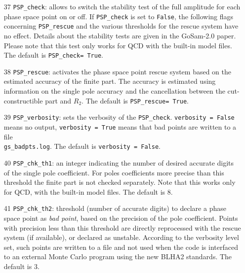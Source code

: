 \documentclass[11pt,a4paper]{refrep}
\newcommand{\gosam}{{\sc GoSam}\xspace}
\begin{document}
\begin{enumerate}
\item[37] \texttt{PSP\_check}: allows to switch the stability test of the full amplitude for 
each phase space point on or off.
If \texttt{PSP\_check} is set to {\tt False}, the following flags concerning 
\texttt{PSP\_rescue} and the various thresholds for the rescue system have no effect.
Details about the stability tests are given in the \gosam-2.0 paper.
Please note that this test only works for QCD  with the built-in model files.
The default is \texttt{PSP\_check= True}. 
\item[38] \texttt{PSP\_rescue}:  
    activates the phase space point rescue system based on the estimated       
    accuracy of the finite part.                                    
    The accuracy is estimated using information on the single       
    pole accuracy and the cancellation between the cut-constructible    
    part and $R_2$.                                                    
The default is \texttt{PSP\_rescue= True}. 
\item[39] \texttt{PSP\_verbosity}:     sets the verbosity of the {\tt PSP\_check}. 
{\tt verbosity = False} means no output,                                     
{\tt verbosity = True} means that bad points are written to a file \\{\tt gs\_badpts.log}.
 The default is {\tt verbosity = False}.
\item[40] \texttt{PSP\_chk\_th1}: an integer indicating the  number of desired accurate digits
of the single pole coefficient. For poles coefficients more precise than this
threshold the finite part is not checked separately.
Note that this works only for QCD, with the built-in model files.    
The default is 8. 
\item[41] \texttt{PSP\_chk\_th2}: threshold (number of accurate digits) to declare a 
phase space point  as {\it bad point}, based on the precision of the pole coefficient.
Points with precision less than this threshold are directly reprocessed with 
    the rescue system (if available), or declared as unstable. According to the
    verbosity level set, such points are written to a file and not used when
    the code is interfaced to an external Monte Carlo program using the new BLHA2 standards.
The default is 3. 


\end{enumerate}
\end{document}
